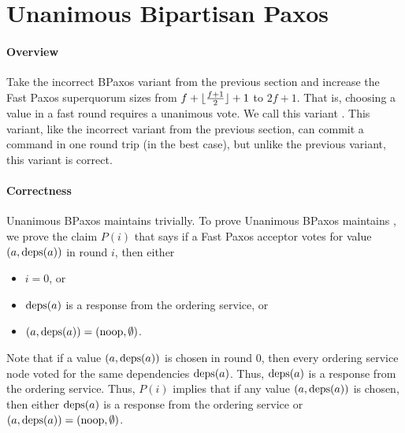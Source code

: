 \section{Unanimous Bipartisan Paxos}
\paragraph{Overview}
Take the incorrect BPaxos variant from the previous section and increase the
Fast Paxos superquorum sizes from $f + \lfloor\frac{f+1}{2}\rfloor + 1$ to $2f + 1$.
That is, choosing a value in a fast round requires a unanimous vote. We call
this variant . This variant, like the incorrect
variant from the previous section, can commit a command in one round trip (in
the best case), but unlike the previous variant, this variant is correct.

\paragraph{Correctness}
Unanimous BPaxos maintains  trivially. To prove Unanimous
BPaxos maintains , we prove the claim $P(i)$ that
says if a Fast Paxos acceptor votes for value $(a, \text{deps}(a))$ in round $i$,
then either
\begin{itemize}
  \item
    $i = 0$, or
  \item
    $\text{deps}(a)$ is a response from the ordering service, or
  \item
    $(a, \text{deps}(a)) = (\text{noop}, \emptyset)$.
\end{itemize}

Note that if a value $(a, \text{deps}(a))$ is chosen in round $0$, then every
ordering service node voted for the same dependencies $\text{deps}(a)$. Thus,
$\text{deps}(a)$ is a response from the ordering service. Thus, $P(i)$ implies that
if any value $(a, \text{deps}(a))$ is chosen, then either $\text{deps}(a)$ is a response
from the ordering service or $(a, \text{deps}(a)) = (\text{noop}, \emptyset)$.


